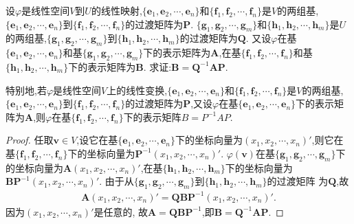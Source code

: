 \documentclass[../../main.tex]{subfiles}%
\begin{document}
\begin{proposition}\label{proposition:线性映射与过渡矩阵}
设\(\varphi\)是线性空间\(V\)到\(U\)的线性映射,\(\{\boldsymbol{e}_1,\boldsymbol{e}_2,\cdots,\boldsymbol{e}_n\}\)和\(\{\boldsymbol{f}_1,\boldsymbol{f}_2,\cdots,\boldsymbol{f}_n\}\)是\(V\)的两组基,\(\{\boldsymbol{e}_1,\boldsymbol{e}_2,\cdots,\boldsymbol{e}_n\}\)到\(\{\boldsymbol{f}_1,\boldsymbol{f}_2,\cdots,\boldsymbol{f}_n\}\)的过渡矩阵为\(\boldsymbol{P}\). \(\{\boldsymbol{g}_1,\boldsymbol{g}_2,\cdots,\boldsymbol{g}_m\}\)和\(\{\boldsymbol{h}_1,\boldsymbol{h}_2,\cdots,\boldsymbol{h}_m\}\)是\(U\)的两组基,\(\{\boldsymbol{g}_1,\boldsymbol{g}_2,\cdots,\boldsymbol{g}_m\}\)到\(\{\boldsymbol{h}_1,\boldsymbol{h}_2,\cdots,\boldsymbol{h}_m\}\)的过渡矩阵为\(\boldsymbol{Q}\). 又设\(\varphi\)在基\(\{\boldsymbol{e}_1,\boldsymbol{e}_2,\cdots,\boldsymbol{e}_n\}\)和基\(\{\boldsymbol{g}_1,\boldsymbol{g}_2,\cdots,\boldsymbol{g}_m\}\)下的表示矩阵为\(\boldsymbol{A}\),在基\(\{\boldsymbol{f}_1,\boldsymbol{f}_2,\cdots,\boldsymbol{f}_n\}\)和基\(\{\boldsymbol{h}_1,\boldsymbol{h}_2,\cdots,\boldsymbol{h}_m\}\)下的表示矩阵为\(\boldsymbol{B}\). 求证:\(\boldsymbol{B}=\boldsymbol{Q}^{-1}\boldsymbol{A}\boldsymbol{P}\).

特别地,若$\varphi$是线性空间$V$上的线性变换,\(\{\boldsymbol{e}_1,\boldsymbol{e}_2,\cdots,\boldsymbol{e}_n\}\)和\(\{\boldsymbol{f}_1,\boldsymbol{f}_2,\cdots,\boldsymbol{f}_n\}\)是\(V\)的两组基,\(\{\boldsymbol{e}_1,\boldsymbol{e}_2,\cdots,\boldsymbol{e}_n\}\)到\(\{\boldsymbol{f}_1,\boldsymbol{f}_2,\cdots,\boldsymbol{f}_n\}\)的过渡矩阵为\(\boldsymbol{P}\),又设\(\varphi\)在基\(\{\boldsymbol{e}_1,\boldsymbol{e}_2,\cdots,\boldsymbol{e}_n\}\)下的表示矩阵为\(\boldsymbol{A}\),则$\varphi$在基\(\{\boldsymbol{f}_1,\boldsymbol{f}_2,\cdots,\boldsymbol{f}_n\}\)下的表示矩阵$B=P^{-1}AP$.
\end{proposition}
\begin{proof}
任取\(\boldsymbol{v}\in V\),设它在基\(\{\boldsymbol{e}_1,\boldsymbol{e}_2,\cdots,\boldsymbol{e}_n\}\)下的坐标向量为\((x_1,x_2,\cdots,x_n)'\),则它在基\(\{\boldsymbol{f}_1,\boldsymbol{f}_2,\cdots,\boldsymbol{f}_n\}\)下的坐标向量为\(\boldsymbol{P}^{-1}(x_1,x_2,\cdots,x_n)'\). \(\varphi(\boldsymbol{v})\)在基\(\{\boldsymbol{g}_1,\boldsymbol{g}_2,\cdots,\boldsymbol{g}_m\}\)下的坐标向量为\(\boldsymbol{A}(x_1,x_2,\cdots,x_n)'\),在基\(\{\boldsymbol{h}_1,\boldsymbol{h}_2,\cdots,\boldsymbol{h}_m\}\)下的坐标向量为\(\boldsymbol{B}\boldsymbol{P}^{-1}(x_1,x_2,\cdots,x_n)'\). 由于从\(\{\boldsymbol{g}_1,\boldsymbol{g}_2,\cdots,\boldsymbol{g}_m\}\)到\(\{\boldsymbol{h}_1,\boldsymbol{h}_2,\cdots,\boldsymbol{h}_m\}\)的过渡矩阵
为\(\boldsymbol{Q}\),故
\begin{align*}
\boldsymbol{A}(x_1,x_2,\cdots,x_n)'=\boldsymbol{Q}\boldsymbol{B}\boldsymbol{P}^{-1}(x_1,x_2,\cdots,x_n)'.  
\end{align*}
因为\((x_1,x_2,\cdots,x_n)'\)是任意的,
故\(\boldsymbol{A}=\boldsymbol{Q}\boldsymbol{B}\boldsymbol{P}^{-1}\),即\(\boldsymbol{B}=\boldsymbol{Q}^{-1}\boldsymbol{A}\boldsymbol{P}\).
\end{proof}
\end{document}
